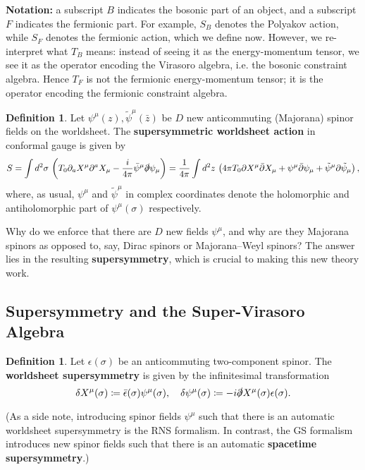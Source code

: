 \documentclass{report}
\theoremstyle{plain}
\theoremstyle{definition}
\newtheorem{definition}[theorem]{Definition}
\theoremstyle{remark}
\newcommand{\di}{\partial}
\newcommand{\bz}{\bar{z}}
\newcommand{\bdi}{\bar{\di}}
\begin{document}
{\bf Notation:} a subscript $B$ indicates the bosonic part of an
object, and a subscript $F$ indicates the fermionic part. For example,
$S_B$ denotes the Polyakov action, while $S_F$ denotes the fermionic
action, which we define now. However, we re-interpret what $T_B$
means: instead of seeing it as the energy-momentum tensor, we see it
as the operator encoding the Virasoro algebra, i.e. the bosonic
constraint algebra. Hence $T_F$ is not the fermionic energy-momentum
tensor; it is the operator encoding the fermionic constraint algebra.

\begin{definition}
  Let $\psi^\mu(z), \tilde{\psi}^\mu(\bz)$ be $D$ new anticommuting
  (Majorana) spinor fields on the worldsheet. The {\bf supersymmetric
    worldsheet action} in conformal gauge is given by
  \[ S = \int d^2\sigma \, \left(T_0 \di_a X^\mu \di^a X_\mu - \frac{i}{4\pi}\bar{\psi}^\mu \slashed{\di} \psi_\mu\right) = \frac{1}{4\pi}\int d^2z \, \left(4\pi T_0\di X^\mu \bdi X_\mu + \psi^\mu \bdi \psi_\mu + \tilde{\psi}^\mu \di \tilde{\psi}_\mu\right), \]
  where, as usual, $\psi^\mu$ and $\tilde{\psi}^\mu$ in complex
  coordinates denote the holomorphic and antiholomorphic part of
  $\psi^\mu(\sigma)$ respectively.
\end{definition}

Why do we enforce that there are $D$ new fields $\psi^\mu$, and why
are they Majorana spinors as opposed to, say, Dirac spinors or
Majorana--Weyl spinors? The answer lies in the resulting {\bf
  supersymmetry}, which is crucial to making this new theory work.

\subsection{Supersymmetry and the Super-Virasoro Algebra}

\begin{definition}
  Let $\epsilon(\sigma)$ be an anticommuting two-component spinor. The
  {\bf worldsheet supersymmetry} is given by the infinitesimal
  transformation
  \[ \delta X^\mu(\sigma) \coloneqq \bar{\epsilon}(\sigma) \psi^\mu(\sigma), \quad \delta \psi^\mu(\sigma) \coloneqq -i \slashed{\di} X^\mu(\sigma) \epsilon(\sigma). \]
\end{definition}

(As a side note, introducing spinor fields $\psi^\mu$ such that there
is an automatic worldsheet supersymmetry is the RNS formalism. In
contrast, the GS formalism introduces new spinor fields such that
there is an automatic {\bf spacetime supersymmetry}.)
\end{document}
